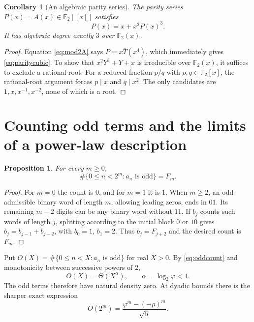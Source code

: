 \documentclass[11pt]{article}
\newtheorem{proposition}[theorem]{Proposition}
\newtheorem{corollary}[theorem]{Corollary}
\theoremstyle{definition}\newtheorem{definition}[theorem]{Definition}
\theoremstyle{remark}\newtheorem{remark}[theorem]{Remark}
\newcommand{\F}{\mathbb F}
\newcommand{\ph}{\varphi}
\begin{document}
\begin{corollary}[An algebraic parity series]\label{cor:paritycubic}
The parity series $P(x)=\overline A(x)\in\F_2[[x]]$ satisfies
\begin{equation}\label{eq:paritycubic}
 P(x)=x+x^2P(x)^3.
\end{equation}
It has algebraic degree exactly $3$ over $\F_2(x)$.
\end{corollary}
\begin{proof}
Equation \eqref{eq:mod2A} says $P=x\overline T(x^4)$, which immediately
gives \eqref{eq:paritycubic}. To show that
$x^2Y^3+Y+x$ is irreducible over $\F_2(x)$, it suffices to exclude a
rational root. For a reduced fraction $p/q$ with $p,q\in\F_2[x]$, the
rational-root argument forces $p\mid x$ and $q\mid x^2$. The only
candidates are $1,x,x^{-1},x^{-2}$, none of which is a root.
\end{proof}

\section{Counting odd terms and the limits of a power-law description}\label{sec:oddcount}

\begin{proposition}\label{prop:fibcount}
For every $m\geq0$,
\begin{equation}\label{eq:oddcount}
 \#\{0\leq n<2^m:a_n\text{ is odd}\}=F_m.
\end{equation}
\end{proposition}
\begin{proof}
For $m=0$ the count is $0$, and for $m=1$ it is $1$. When $m\geq2$,
an odd admissible binary word of length $m$, allowing leading zeros,
ends in $01$. Its remaining $m-2$ digits can be any binary word without
$11$. If $b_j$ counts such words of length $j$, splitting according to
the initial block $0$ or $10$ gives $b_j=b_{j-1}+b_{j-2}$, with
$b_0=1$, $b_1=2$. Thus $b_j=F_{j+2}$ and the desired count is $F_m$.
\end{proof}

Put $O(X)=\#\{0\leq n<X:a_n\text{ is odd}\}$ for real $X>0$.
By \eqref{eq:oddcount} and monotonicity between successive powers of $2$,
\begin{equation}\label{eq:oddgrowth}
 O(X)=\Theta(X^\alpha),\qquad \alpha=\log_2\ph<1.
\end{equation}
The odd terms therefore have natural density zero. At dyadic bounds there
is the sharper exact expression
\[
 O(2^m)=\frac{\ph^m-(-\rho)^m}{\sqrt5}.
\]
\end{document}
